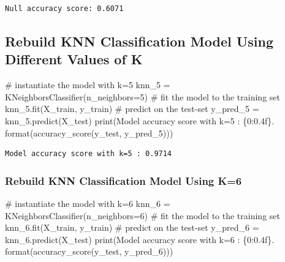 \documentclass[
  letterpaper,
  DIV=11,
  numbers=noendperiod]{scrreprt}
\newenvironment{Shaded}{\begin{snugshade}}{\end{snugshade}}
\newcommand{\BuiltInTok}[1]{\textcolor[rgb]{0.00,0.23,0.31}{#1}}
\newcommand{\CommentTok}[1]{\textcolor[rgb]{0.37,0.37,0.37}{#1}}
\newcommand{\DecValTok}[1]{\textcolor[rgb]{0.68,0.00,0.00}{#1}}
\newcommand{\NormalTok}[1]{\textcolor[rgb]{0.00,0.23,0.31}{#1}}
\newcommand{\OperatorTok}[1]{\textcolor[rgb]{0.37,0.37,0.37}{#1}}
\newcommand{\SpecialCharTok}[1]{\textcolor[rgb]{0.37,0.37,0.37}{#1}}
\newcommand{\StringTok}[1]{\textcolor[rgb]{0.13,0.47,0.30}{#1}}
\begin{document}
\begin{verbatim}
Null accuracy score: 0.6071
\end{verbatim}

\subsection{Rebuild KNN Classification Model Using Different Values of
K}\label{rebuild-knn-classification-model-using-different-values-of-k}

\begin{Shaded}
\begin{Highlighting}[]
\CommentTok{\# instantiate the model with k=5}
\NormalTok{knn\_5 }\OperatorTok{=}\NormalTok{ KNeighborsClassifier(n\_neighbors}\OperatorTok{=}\DecValTok{5}\NormalTok{)}
\CommentTok{\# fit the model to the training set}
\NormalTok{knn\_5.fit(X\_train, y\_train)}
\CommentTok{\# predict on the test{-}set}
\NormalTok{y\_pred\_5 }\OperatorTok{=}\NormalTok{ knn\_5.predict(X\_test)}
\BuiltInTok{print}\NormalTok{(}\StringTok{\textquotesingle{}Model accuracy score with k=5 : }\SpecialCharTok{\{0:0.4f\}}\StringTok{\textquotesingle{}}\NormalTok{. }\BuiltInTok{format}\NormalTok{(accuracy\_score(y\_test, y\_pred\_5)))}
\end{Highlighting}
\end{Shaded}

\begin{verbatim}
Model accuracy score with k=5 : 0.9714
\end{verbatim}

\subsubsection{Rebuild KNN Classification Model Using
K=6}\label{rebuild-knn-classification-model-using-k6}

\begin{Shaded}
\begin{Highlighting}[]
\CommentTok{\# instantiate the model with k=6}
\NormalTok{knn\_6 }\OperatorTok{=}\NormalTok{ KNeighborsClassifier(n\_neighbors}\OperatorTok{=}\DecValTok{6}\NormalTok{)}
\CommentTok{\# fit the model to the training set}
\NormalTok{knn\_6.fit(X\_train, y\_train)}
\CommentTok{\# predict on the test{-}set}
\NormalTok{y\_pred\_6 }\OperatorTok{=}\NormalTok{ knn\_6.predict(X\_test)}
\BuiltInTok{print}\NormalTok{(}\StringTok{\textquotesingle{}Model accuracy score with k=6 : }\SpecialCharTok{\{0:0.4f\}}\StringTok{\textquotesingle{}}\NormalTok{. }\BuiltInTok{format}\NormalTok{(accuracy\_score(y\_test, y\_pred\_6)))}
\end{Highlighting}
\end{Shaded}
\end{document}
